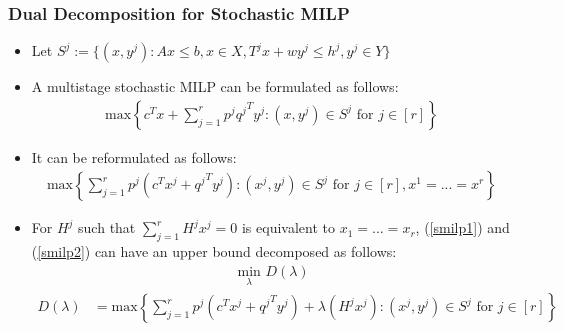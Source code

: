 \documentclass{beamer}
\begin{document}
		\begin{frame}[t]
		\frametitle{Dual Decomposition for Stochastic MILP}
		\small
		\vspace{-.25cm}
		\begin{itemize}
			\item Let $ S^j := \{(x, y^j): Ax \leq b, x \in X, T^j x + w y^j \leq h^j, y^j \in Y\} $
			\item A multistage stochastic MILP can be formulated as follows:
			\begin{align}
				\text{max} \left\{ c^T x + \sum_{j=1}^{r} p^j {q^j}^T y^j : (x, y^j) \in S^j \text{ for } j \in [r] \right\} \label{smilp1}
			\end{align}
			\item It can be reformulated as follows:
			\begin{align}
				\text{max} \left\{ \sum_{j=1}^{r} p^j (c^T x^j + {q^j}^T y^j) : (x^j, y^j) \in S^j \text{ for } j \in [r], x^1 = ... = x^r \right\} \label{smilp2}
			\end{align}
			\item For $ H^j $ such that $ \sum_{j=1}^{r} H^j x^j = 0 $ is equivalent to $ x_1 = ... = x_r $, (\ref{smilp1}) and (\ref{smilp2}) can have an upper bound decomposed as follows:
			\begin{align}
				& \qquad \qquad \qquad \qquad \qquad \underset{\lambda}{\text{ min }} D(\lambda) \label{LD} \tag{LD} \\
				D(\lambda) &= \text{max} \left\{ \sum_{j=1}^{r} p^j (c^T x^j + {q^j}^T y^j) + \lambda(H^j x^j) : (x^j, y^j) \in S^j \text{ for } j \in [r] \right\} \nonumber
			\end{align}
		\end{itemize}
		\normalsize
	\end{frame}
	
\end{document}

